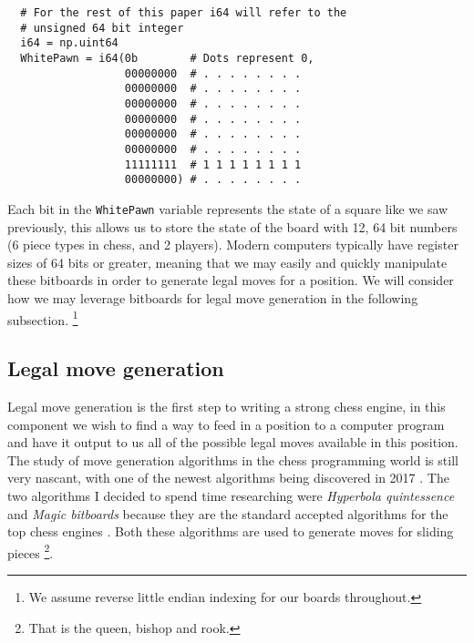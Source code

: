 \begin{verbatim}
  # For the rest of this paper i64 will refer to the 
  # unsigned 64 bit integer
  i64 = np.uint64
  WhitePawn = i64(0b        # Dots represent 0,
                  00000000  # . . . . . . . .
                  00000000  # . . . . . . . .
                  00000000  # . . . . . . . .
                  00000000  # . . . . . . . .
                  00000000  # . . . . . . . .
                  00000000  # . . . . . . . .
                  11111111  # 1 1 1 1 1 1 1 1
                  00000000) # . . . . . . . .
\end{verbatim}

Each bit in the \texttt{WhitePawn} variable represents the
state of a square like we saw previously, this allows us to 
store the state of the board with 12, 64 bit numbers 
(6 piece types in chess, and 2 players). Modern computers
typically have register sizes of 64 bits or greater, 
meaning that we may easily and quickly manipulate these 
bitboards in order to generate legal moves for a position.
We will consider how we may leverage bitboards for legal 
move generation in the following subsection. 
\footnote{We assume reverse little endian indexing for 
our boards throughout.}

\subsection*{Legal move generation}
Legal move generation is the first step to writing a strong
chess engine, in this component we wish to 
find a way to feed in a position to a computer program and have it 
output to us all of the possible legal moves available in this position.
The study of move generation algorithms in the chess programming world 
is still very nascant, with one of the newest algorithms
being discovered in 2017 \cite{bm}. The two algorithms I
decided to spend time researching were
\textit{Hyperbola quintessence} and 
\textit{Magic bitboards} because they are the standard 
accepted algorithms for the top chess engines 
\cite{stockfish}. Both these algorithms are used to generate
moves for sliding pieces 
\footnote{That is the queen, bishop and rook.}.\\

